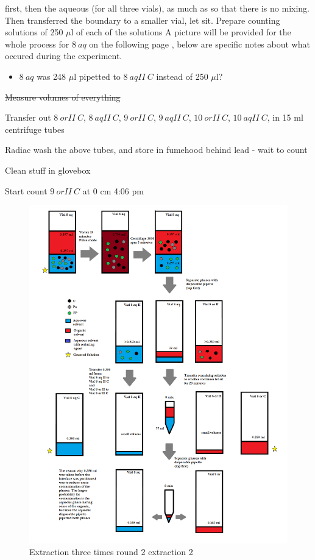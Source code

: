 \documentclass[idxtotoc,hyperref,openany,oneside]{labbook} %
\newcommand{\cmark}{\ding{51}}%
\newcommand{\done}{\rlap{$\square$}{\raisebox{2pt}{\large\hspace{1pt}\cmark}}%
  \hspace{-2.5pt}}
\begin{document}
\begin{todolist}
{  first, then the aqueous (for all three vials),
  as much as so that there is no mixing.
  Then transferred the boundary to a smaller vial, let sit.
  Prepare counting solutions of 250 $\mu$l of each of the solutions
  A picture will be provided for the whole process for $\boxed{8\ aq}$
  on the following page
  , below are specific notes about what
  occured during the experiment.}
  \begin{itemize}
  \item{$\boxed{8\ aq}$ was 248 $\mu$l pipetted to $\boxed{8\ aqII\ C}$
  instead of 250 $\mu$l?}
  \end{itemize}
\item{\st{Measure volumes of everything}}
\item[\done]{Transfer out $\boxed{8\ orII\ C}$, $\boxed{8\ aqII\ C}$,
  $\boxed{9\ orII\ C}$, $\boxed{9\ aqII\ C}$, $\boxed{10\ orII\ C}$,
  $\boxed{10\ aqII\ C}$, in 15 ml centrifuge tubes}
\item[\done]{Radiac wash the above tubes, and store in fumehood behind
  lead - wait to count}
\item[\done]{Clean stuff in glovebox}
\item[\done]{Start count $\boxed{9\ orII\ C}$ at 0 cm 4:06 pm}
\end{todolist}

\begin{figure}[H] %
\begin{center}
  \includegraphics[width=0.8\linewidth]
                  {Figures/Cycle_x3_round_2_extraction_2}
\end{center}
\caption{Extraction three times round 2 extraction 2}
\label{fig:round2_extraction2}
\end{figure}
\end{document}

